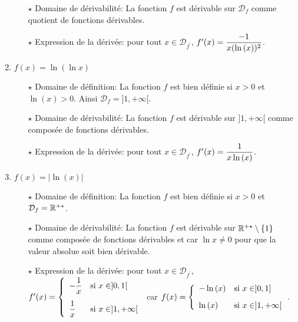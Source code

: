 \documentclass[a4paper, 11pt,reqno]{article}
\begin{document}
\begin{correction}
\begin{enumerate}
\begin{itemize}
			      \item[$\star$] Domaine de d\'erivabilit\'e: La fonction $f$ est d\'erivable sur $\mathcal{D}_f$ comme quotient de fonctions d\'erivables.
			      \item[$\star$] Expression de la d\'eriv\'ee: pour tout $x\in\mathcal{D}_{f^{\prime}}$, $f^{\prime}(x)=\displaystyle\frac{-1}{x(\ln{(x)})^2}$.
		      \end{itemize}
		\item $f(x)=\ln{(\ln{x})}$\\
		      \begin{itemize}
			      \item[$\star$] Domaine de d\'efinition: La fonction $f$ est bien d\'efinie si $x>0$ et $\ln{(x)}>0$. Ainsi $\mathcal{D}_f=\rbrack 1,+\infty\lbrack$.
			      \item[$\star$] Domaine de d\'erivabilit\'e: La fonction $f$ est d\'erivable sur $\rbrack 1,+\infty\lbrack$ comme compos\'ee de fonctions d\'erivables.
			      \item[$\star$] Expression de la d\'eriv\'ee: pour tout $x\in\mathcal{D}_{f^{\prime}}$, $f^{\prime}(x)=\displaystyle\frac{1}{x\ln{(x)}}$.
		      \end{itemize}
		\item $f(x)=|\ln{(x)}|$\\
		      \begin{itemize}
			      \item[$\star$] Domaine de d\'efinition: La fonction $f$ est bien d\'efinie si $x>0$ et $\mathcal{D}_f=\mathbb{R}^{+\star}$.
			      \item[$\star$] Domaine de d\'erivabilit\'e: La fonction $f$ est d\'erivable sur $\mathbb{R}^{+\star}\setminus\lbrace 1\rbrace$ comme compos\'ee de fonctions d\'erivables et car $\ln{x}\not= 0$ pour que la valeur absolue soit bien d\'erivable.
			      \item[$\star$] Expression de la d\'eriv\'ee: pour tout $x\in\mathcal{D}_{f^{\prime}}$, $f^{\prime}(x)=\left\lbrace\begin{array}{ll}
					            -\ddp\frac{1}{x} & \hbox{si}\ x\in\rbrack 0,1\lbrack\vsec  \\
					            \ddp\frac{1}{x}  & \hbox{si}\ x\in\rbrack 1,+\infty\lbrack
				            \end{array}\right.$ car $f(x)=\left\lbrace\begin{array}{ll}
					            -\ln{(x)} & \hbox{si}\ x\in\rbrack 0,1\rbrack\vsec  \\
					            \ln{(x)}  & \hbox{si}\ x\in\rbrack 1,+\infty\lbrack
				            \end{array}\right.$.
		      \end{itemize}

	\end{enumerate}
\end{correction}
\end{document}
